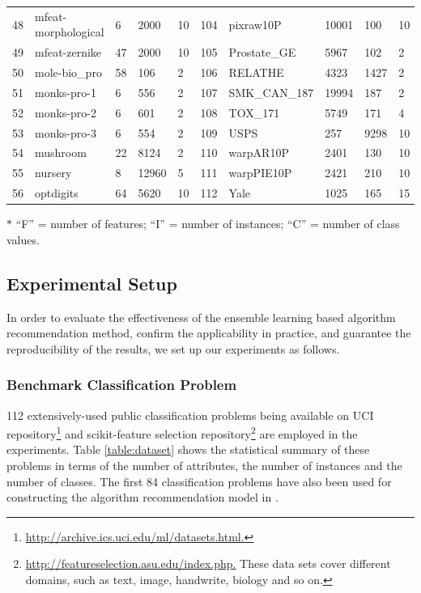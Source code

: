 \documentclass[prodmode,acmtkdd]{acmsmall}
\begin{document}
\begin{table}[!h]
{\begin{threeparttable}
\begin{tabular}{l l l l l | l l l l l}
48 & mfeat-morphological & 6 & 2000 & 10 & 104 & pixraw10P & 10001 & 100 & 10\\
49 & mfeat-zernike & 47 & 2000 & 10 & 105 & Prostate\_GE & 5967 & 102 & 2\\
50 & mole-bio\_pro & 58 & 106 & 2 & 106 & RELATHE & 4323 & 1427 & 2\\
51 & monks-pro-1 & 6 & 556 & 2 & 107 & SMK\_CAN\_187 & 19994 & 187 & 2\\
52 & monks-pro-2 & 6 & 601 & 2 & 108 & TOX\_171  & 5749 & 171 & 4\\
53 & monks-pro-3 & 6 & 554 & 2 & 109 & USPS & 257 & 9298 & 10\\
54 & mushroom & 22 & 8124 & 2 & 110 & warpAR10P  & 2401 & 130 & 10\\
55 & nursery & 8 & 12960 & 5 & 111 & warpPIE10P & 2421 & 210 & 10\\
56 & optdigits & 64 & 5620 & 10 & 112 & Yale & 1025 & 165 & 15\\
    \hline
    \end{tabular}
        \begin{tablenotes}
            \footnotesize
            \item [$\ast$] ``F'' = number of features;
            ``I'' = number of instances; ``C'' = number of class values.
        \end{tablenotes}
    \end{threeparttable}
    }
\end{table}
\subsection{Experimental Setup}

In order to evaluate the effectiveness of the ensemble learning
based algorithm recommendation method, confirm the applicability in
practice, and guarantee the reproducibility of the results, we set
up our experiments as follows.

\subsubsection{Benchmark Classification Problem}

112 extensively-used public classification problems being available
on UCI
repository\footnote{\url{http://archive.ics.uci.edu/ml/datasets.html.}} and scikit-feature selection repository\footnote{\url{http://featureselection.asu.edu/index.php.} These data sets cover different domains, such as text, image, handwrite, biology and so on.}
are employed in the experiments. Table \ref{table:dataset} shows the
statistical summary of these problems in terms of the number of
attributes, the number of instances and the number of classes. The first 84
classification problems have also been used for constructing the
algorithm recommendation model in \cite{wang2014generic}.
\end{document}
